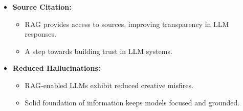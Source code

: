\begin{frame}[fragile]
\begin{itemize}

  \item \textbf{Source Citation:}
    \begin{itemize}
      \item RAG provides access to sources, improving transparency in LLM responses.
      \item A step towards building trust in LLM systems.
    \end{itemize}

  \item \textbf{Reduced Hallucinations:}
    \begin{itemize}
      \item RAG-enabled LLMs exhibit reduced creative misfires.
      \item Solid foundation of information keeps models focused and grounded.
    \end{itemize}

\end{itemize}

\end{frame}


